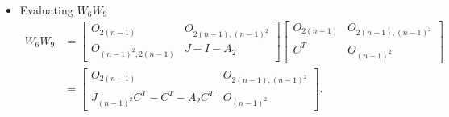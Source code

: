 \begin{itemize}
    \item Evaluating $W_6W_9$
    \begin{align*}
        W_6W_9
        &= \begin{bmatrix}
            O_{2(n-1)} & O_{2(n-1), (n-1)^2} \\
            O_{(n-1)^2, 2(n-1)} & J-I-A_2
        \end{bmatrix}\begin{bmatrix}
            O_{2(n-1)} & O_{2(n-1), (n-1)^2} \\
            C^T & O_{(n-1)^2}
        \end{bmatrix}\\
        &= \begin{bmatrix}
            O_{2(n-1)} & O_{2(n-1), (n-1)^2} \\
            J_{(n-1)^2}C^T - C^T -A_2C^T& O_{(n-1)^2}
        \end{bmatrix}.
    \end{align*}


\end{itemize}
